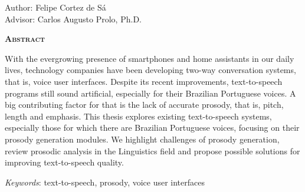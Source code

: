 \begin{center}
	{\Large{\textbf{\tccTitleEn}}}
\end{center}

\vspace{1cm}

\begin{flushright}
	Author: Felipe Cortez de Sá \\
	Advisor: Carlos Augusto Prolo, Ph.D.
\end{flushright}

\vspace{1cm}

\begin{center}
	\Large{\textsc{\textbf{Abstract}}}
\end{center}

\noindent With the evergrowing presence of smartphones and home assistants in
our daily lives, technology companies have been developing two-way conversation
systems, that is, voice user interfaces. Despite its recent improvements,
text-to-speech programs still sound artificial, especially for their Brazilian
Portuguese voices. A big contributing factor for that is the lack of accurate
prosody, that is, pitch, length and emphasis. This thesis explores existing
text-to-speech systems, especially those for which there are Brazilian
Portuguese voices, focusing on their prosody generation modules. We highlight
challenges of prosody generation, review prosodic analysis in the Linguistics
field and propose possible solutions for improving text-to-speech quality.


\noindent\textit{Keywords}: text-to-speech, prosody, voice user interfaces
